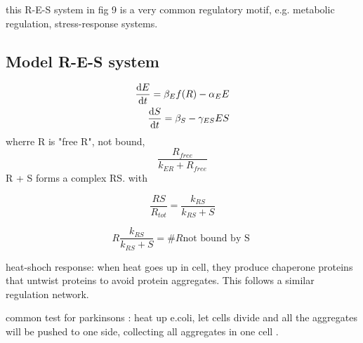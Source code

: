 \documentclass{article}
\begin{document}
this R-E-S system in fig 9 is a very common regulatory motif, e.g. metabolic regulation, stress-response systems. 


\subsection{Model R-E-S system}



\begin{equation}
	\begin{split}
	\dv {E}{t} = \beta _E f(R)- \alpha_EE\\
	\dv {S}{t} = \beta _S- \gamma_{ES}ES
	\end{split}
\end{equation}
wherre R is "free R", not bound, 
\begin{equation}
	\frac{R_{free}}{k_{ER} + R_{free}}
\end{equation}
R + S forms a complex RS. with 

\begin{equation}
	\frac{RS}{R_{tot}} = \frac{k_{RS}}{k_{RS} + S}
\end{equation}

\begin{equation}
	R \frac{k_{RS}}{k_{RS} + S} = \#R \text{not bound by S }
\end{equation}





heat-shoch response: when heat goes up in cell, they produce chaperone proteins that untwist proteins to avoid protein aggregates. This follows a similar regulation network. 

common test for parkinsons : heat up e.coli, let cells divide and all the aggregates will be pushed to one side, collecting all aggregates in one cell . 
\end{document}
